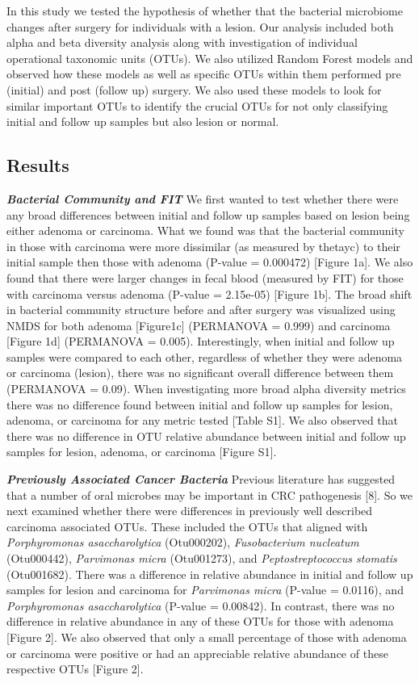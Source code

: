 \documentclass[12pt,]{article}
\begin{document}
In this study we tested the hypothesis of whether that the bacterial
microbiome changes after surgery for individuals with a lesion. Our
analysis included both alpha and beta diversity analysis along with
investigation of individual operational taxonomic units (OTUs). We also
utilized Random Forest models and observed how these models as well as
specific OTUs within them performed pre (initial) and post (follow up)
surgery. We also used these models to look for similar important OTUs to
identify the crucial OTUs for not only classifying initial and follow up
samples but also lesion or normal.

\newpage

\subsection{Results}\label{results}

\textbf{\emph{Bacterial Community and FIT}} We first wanted to test
whether there were any broad differences between initial and follow up
samples based on lesion being either adenoma or carcinoma. What we found
was that the bacterial community in those with carcinoma were more
dissimilar (as measured by thetayc) to their initial sample then those
with adenoma (P-value = 0.000472) {[}Figure 1a{]}. We also found that
there were larger changes in fecal blood (measured by FIT) for those
with carcinoma versus adenoma (P-value = 2.15e-05) {[}Figure 1b{]}. The
broad shift in bacterial community structure before and after surgery
was visualized using NMDS for both adenoma {[}Figure1c{]} (PERMANOVA =
0.999) and carcinoma {[}Figure 1d{]} (PERMANOVA = 0.005). Interestingly,
when initial and follow up samples were compared to each other,
regardless of whether they were adenoma or carcinoma (lesion), there was
no significant overall difference between them (PERMANOVA = 0.09). When
investigating more broad alpha diversity metrics there was no difference
found between initial and follow up samples for lesion, adenoma, or
carcinoma for any metric tested {[}Table S1{]}. We also observed that
there was no difference in OTU relative abundance between initial and
follow up samples for lesion, adenoma, or carcinoma {[}Figure S1{]}.

\textbf{\emph{Previously Associated Cancer Bacteria}} Previous
literature has suggested that a number of oral microbes may be important
in CRC pathogenesis {[}8{]}. So we next examined whether there were
differences in previously well described carcinoma associated OTUs.
These included the OTUs that aligned with \emph{Porphyromonas
asaccharolytica} (Otu000202), \emph{Fusobacterium nucleatum}
(Otu000442), \emph{Parvimonas micra} (Otu001273), and
\emph{Peptostreptococcus stomatis} (Otu001682). There was a difference
in relative abundance in initial and follow up samples for lesion and
carcinoma for \emph{Parvimonas micra} (P-value = 0.0116), and
\emph{Porphyromonas asaccharolytica} (P-value = 0.00842). In contrast,
there was no difference in relative abundance in any of these OTUs for
those with adenoma {[}Figure 2{]}. We also observed that only a small
percentage of those with adenoma or carcinoma were positive or had an
appreciable relative abundance of these respective OTUs {[}Figure 2{]}.
\end{document}
